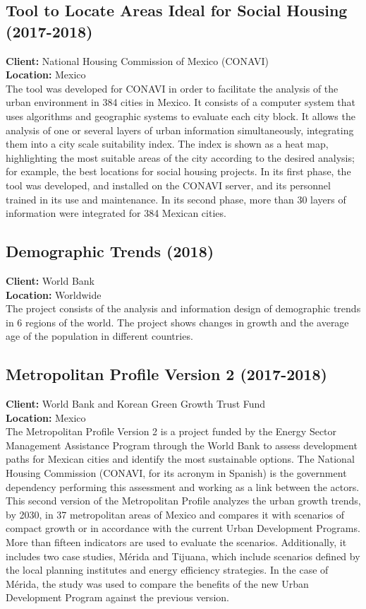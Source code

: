 \documentclass[
	a4paper,
	12pt,
	unnumberedsections,
]{CSSullivanBusinessReport}
\begin{document}
\subsection{Tool to Locate Areas Ideal for Social Housing (2017-2018)}
\textbf{Client:}  National Housing Commission of Mexico (CONAVI) \\
\textbf{Location:}  Mexico \\[0.5em]
 The tool was developed for CONAVI in order to facilitate the analysis of the urban environment in 384 cities in Mexico. It consists of a computer system that uses algorithms and geographic systems to evaluate each city block. It allows the analysis of one or several layers of urban information simultaneously, integrating them into a city scale suitability index. The index is shown as a heat map, highlighting the most suitable areas of the city according to the desired analysis; for example, the best locations for social housing projects. In its first phase, the tool was developed, and installed on the CONAVI server, and its personnel trained in its use and maintenance. In its second phase, more than 30 layers of information were integrated for 384 Mexican cities.

\subsection{Demographic Trends (2018)}
\textbf{Client:}  World Bank \\
\textbf{Location:}  Worldwide \\[0.5em]
 The project consists of the analysis and information design of demographic trends in 6 regions of the world. The project shows changes in growth and the average age of the population in different countries.

\subsection{Metropolitan Profile Version 2 (2017-2018)}
\textbf{Client:}  World Bank and Korean Green Growth Trust Fund \\
\textbf{Location:}  Mexico     \\[0.5em]
 The Metropolitan Profile Version 2 is a project funded by the Energy Sector Management Assistance Program through the World Bank to assess development paths for Mexican cities and identify the most sustainable options. The National Housing Commission (CONAVI, for its acronym in Spanish) is the government dependency performing this assessment and working as a link between the actors. This second version of the Metropolitan Profile analyzes the urban growth trends, by 2030, in 37 metropolitan areas of Mexico and compares it with scenarios of compact growth or in accordance with the current Urban Development Programs. More than fifteen indicators are used to evaluate the scenarios. Additionally, it includes two case studies, Mérida and Tijuana, which include scenarios defined by the local planning institutes and energy efficiency strategies. In the case of Mérida, the study was used to compare the benefits of the new Urban Development Program against the previous version.
\end{document}
